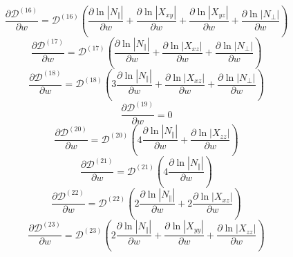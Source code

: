 \documentclass[a4paper,12pt]{article}%
\begin{document}
\begin{equation}
\frac{\partial\mathcal{D}^{\left(  16\right)  }}{\partial w}=\mathcal{D}%
^{\left(  16\right)  }\left(  \frac{\partial\ln\left\vert N_{\Vert}\right\vert
}{\partial w}+\frac{\partial\ln\left\vert X_{xy}\right\vert }{\partial
w}+\frac{\partial\ln\left\vert X_{yz}\right\vert }{\partial w}+\frac
{\partial\ln\left\vert N_{\bot}\right\vert }{\partial w}\right)
\end{equation}%
\begin{equation}
\frac{\partial\mathcal{D}^{\left(  17\right)  }}{\partial w}=\mathcal{D}%
^{\left(  17\right)  }\left(  \frac{\partial\ln\left\vert N_{\Vert}\right\vert
}{\partial w}+\frac{\partial\ln\left\vert X_{xz}\right\vert }{\partial
w}+\frac{\partial\ln\left\vert N_{\bot}\right\vert }{\partial w}\right)
\end{equation}%
\begin{equation}
\frac{\partial\mathcal{D}^{\left(  18\right)  }}{\partial w}=\mathcal{D}%
^{\left(  18\right)  }\left(  3\frac{\partial\ln\left\vert N_{\Vert
}\right\vert }{\partial w}+\frac{\partial\ln\left\vert X_{xz}\right\vert
}{\partial w}+\frac{\partial\ln\left\vert N_{\bot}\right\vert }{\partial
w}\right)
\end{equation}%
\begin{equation}
\frac{\partial\mathcal{D}^{\left(  19\right)  }}{\partial w}=0
\end{equation}%
\begin{equation}
\frac{\partial\mathcal{D}^{\left(  20\right)  }}{\partial w}=\mathcal{D}%
^{\left(  20\right)  }\left(  4\frac{\partial\ln\left\vert N_{\Vert
}\right\vert }{\partial w}+\frac{\partial\ln\left\vert X_{zz}\right\vert
}{\partial w}\right)
\end{equation}%
\begin{equation}
\frac{\partial\mathcal{D}^{\left(  21\right)  }}{\partial w}=\mathcal{D}%
^{\left(  21\right)  }\left(  4\frac{\partial\ln\left\vert N_{\Vert
}\right\vert }{\partial w}\right)
\end{equation}%
\begin{equation}
\frac{\partial\mathcal{D}^{\left(  22\right)  }}{\partial w}=\mathcal{D}%
^{\left(  22\right)  }\left(  2\frac{\partial\ln\left\vert N_{\Vert
}\right\vert }{\partial w}+2\frac{\partial\ln\left\vert X_{xz}\right\vert
}{\partial w}\right)
\end{equation}%
\begin{equation}
\frac{\partial\mathcal{D}^{\left(  23\right)  }}{\partial w}=\mathcal{D}%
^{\left(  23\right)  }\left(  2\frac{\partial\ln\left\vert N_{\Vert
}\right\vert }{\partial w}+\frac{\partial\ln\left\vert X_{yy}\right\vert
}{\partial w}+\frac{\partial\ln\left\vert X_{zz}\right\vert }{\partial
w}\right)
\end{equation}%
\end{document}
